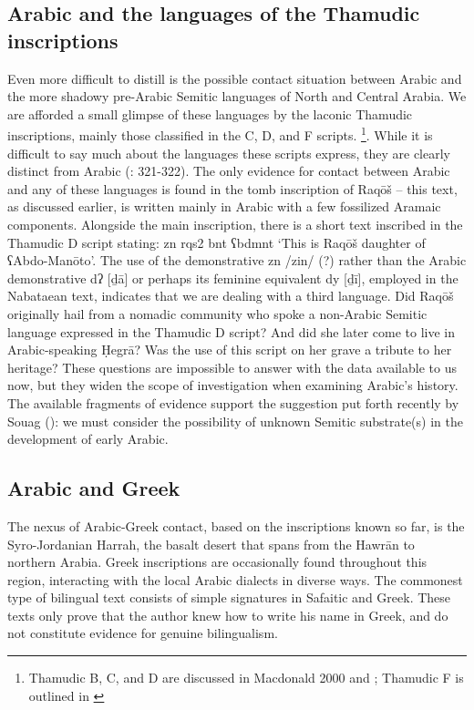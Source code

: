 \documentclass[output=paper]{langsci/langscibook}
\begin{document}
\subsection{Arabic and the languages of the Thamudic inscriptions}
Even more difficult to distill is the possible contact situation between Arabic and the more shadowy pre-Arabic Semitic languages of North and Central Arabia. We are afforded a small glimpse of these languages by the laconic Thamudic inscriptions, mainly those classified in the C, D, and F scripts. \footnote{Thamudic B, C, and D are discussed in Macdonald 2000 and \citep{Al-Jallad2017,Al-Jallad2018ANA}; Thamudic F is outlined in \citep{Prioletta&Robin2018}}.  While it is diffi\citep{macdonald 2000}cult to say much about the languages these scripts express, they are clearly distinct from Arabic (\citet{Al-Jallad2017a}: 321-322). The only evidence for contact between Arabic and any of these languages is found in the tomb inscription of Raqōš – this text, as discussed earlier, is written mainly in Arabic with a few fossilized Aramaic components. Alongside the main inscription, there is a short text inscribed in the Thamudic D script stating: zn rqs2 bnt ʕbdmnt ‘This is Raqōš daughter of ʕAbdo-Manōto’. The use of the demonstrative zn /zin/ (?) rather than the Arabic demonstrative dʔ [ḏā] or perhaps its feminine equivalent dy [ḏī], employed in the Nabataean text, indicates that we are dealing with a third language. Did Raqōš originally hail from a nomadic community who spoke a non-Arabic Semitic language expressed in the Thamudic D script? And did she later come to live in Arabic-speaking Ḥegrā? Was the use of this script on her grave a tribute to her heritage? These questions are impossible to answer with the data available to us now, but they widen the scope of investigation when examining Arabic’s history. The available fragments of evidence support the suggestion put forth recently by Souag  (\citet{souag2018blog}): we must consider the possibility of unknown Semitic substrate(s) in the development of early Arabic.

\subsection{Arabic and Greek}
The nexus of Arabic-Greek contact, based on the inscriptions known so far, is the Syro-Jordanian Harrah, the basalt desert that spans from the Hawrān to northern Arabia. Greek inscriptions are occasionally found throughout this region, interacting with the local Arabic dialects in diverse ways. The commonest type of bilingual text consists of simple signatures in Safaitic and Greek. These texts only prove that the author knew how to write his name in Greek, and do not constitute evidence for genuine bilingualism. 
\end{document}

